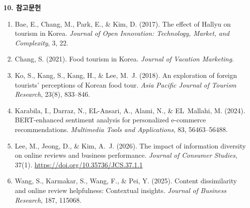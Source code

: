 \documentclass[10pt,a4paper]{article}
\newcommand{\sect}[1]{\vspace{3pt}\noindent\textbf{#1}\par\vspace{1pt}}
\begin{document}
\sect{10. 참고문헌}
\begin{enumerate}\small
  \item Bae, E., Chang, M., Park, E., \& Kim, D. (2017). The effect of Hallyu on tourism in Korea. \textit{Journal of Open Innovation: Technology, Market, and Complexity}, 3, 22.
  \item Chang, S. (2021). Food tourism in Korea. \textit{Journal of Vacation Marketing}.
  \item Ko, S., Kang, S., Kang, H., \& Lee, M.~J. (2018). An exploration of foreign tourists' perceptions of Korean food tour. \textit{Asia Pacific Journal of Tourism Research}, 23(8), 833--846.
  \item Karabila, I., Darraz, N., EL-Ansari, A., Alami, N., \& EL~Mallahi, M. (2024). BERT-enhanced sentiment analysis for personalized e-commerce recommendations. \textit{Multimedia Tools and Applications}, 83, 56463--56488.
  \item Lee, M., Jeong, D., \& Kim, A.~J. (2026). The impact of information diversity on online reviews and business performance. \textit{Journal of Consumer Studies}, 37(1). \url{https://doi.org/10.35736/JCS.37.1.1}
  \item Wang, S., Karmakar, S., Wang, F., \& Pei, Y. (2025). Content dissimilarity and online review helpfulness: Contextual insights. \textit{Journal of Business Research}, 187, 115068.
\end{enumerate}
\end{document}
